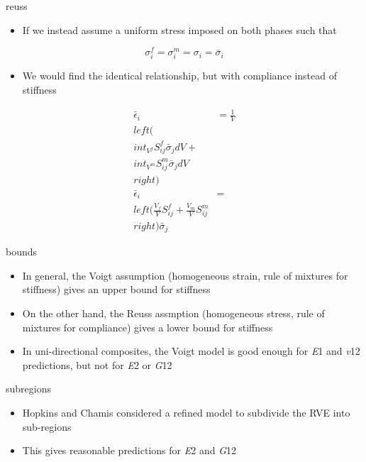 \documentclass[
  letterpaper,
  ignorenonframetext,
  aspectratio=43,
  handout,
  12pt]{beamer}
\providecommand{\tightlist}{%
  \setlength{\itemsep}{0pt}\setlength{\parskip}{0pt}}
\providecommand{\tightlist}{%
\setlength{\itemsep}{0pt}\setlength{\parskip}{0pt}}
\begin{document}
\begin{frame}{reuss}
\protect\hypertarget{reuss}{}
\begin{itemize}
\tightlist
\item
  If we instead assume a uniform stress imposed on both phases such that
\end{itemize}

\[\sigma_i^f = \sigma_i^m = \sigma_i = \bar{\sigma}_i\]

\begin{itemize}
\tightlist
\item
  We would find the identical relationship, but with compliance instead
  of stiffness
\end{itemize}

\[\begin{aligned}
  \bar{\epsilon}_i &= \frac{1}{V}\\left(\\int_{V^f} S_{ij}^f\bar{\sigma}_j dV  + \\int_{V^m} S_{ij}^m\bar{\sigma}_j dV\\right)\\
  \bar{\epsilon}_i &= \\left( \frac{V_f}{V} S_{ij}^f + \frac{V_m}{V} S_{ij}^m\\right)\bar{\sigma}_j
\end{aligned}\]
\end{frame}

\begin{frame}{bounds}
\protect\hypertarget{bounds}{}
\begin{itemize}
\tightlist
\item
  In general, the Voigt assumption (homogeneous strain, rule of mixtures
  for stiffness) gives an upper bound for stiffness
\item
  On the other hand, the Reuss assmption (homogeneous stress, rule of
  mixtures for compliance) gives a lower bound for stiffness
\item
  In uni-directional composites, the Voigt model is good enough for
  \emph{E}1 and \emph{v}12 predictions, but not for \emph{E}2 or
  \emph{G}12
\end{itemize}
\end{frame}

\begin{frame}{subregions}
\protect\hypertarget{subregions}{}
\begin{itemize}
\tightlist
\item
  Hopkins and Chamis considered a refined model to subdivide the RVE
  into sub-regions
\item
  This gives reasonable predictions for \emph{E}2 and \emph{G}12
\end{itemize}
\end{frame}
\end{document}

